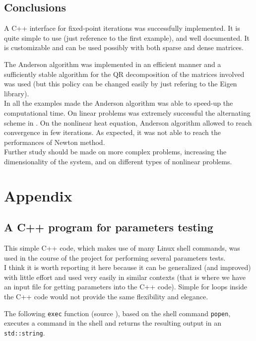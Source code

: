\documentclass[12pt]{article}
\begin{document}
			\subsection{Conclusions}
			A C++ interface for fixed-point iterations was successfully implemented. It is quite simple
			to use (just reference to the first example), and well documented. It is customizable and can be
			used possibly with both sparse and dense matrices.
			
			The Anderson algorithm was implemented in
			an efficient manner and a sufficiently stable algorithm for the QR decomposition of the
			matrices involved was used (but this policy can be changed easily by just refering to the Eigen
			library).\\
			In all the examples made the Anderson algorithm was able to speed-up the computational
			time.	On linear problems was extremely successful the alternating scheme in \cite{Pratapa}.
			On the nonlinear heat equation, Anderson algorithm allowed to reach convergence in few
			iterations. As expected, it was not able to reach the performances of Newton method.\\
			Further study should be made on more complex problems, increasing the dimensionality
			of the system, and on different types of nonlinear problems.

			\appendix
			\section{Appendix}
			\subsection{A C++ program for parameters testing}
			This simple C++ code, which makes use of many Linux shell commands, was used in
			the course of the project for performing several parameters tests.\\ 
			I think it is worth reporting it here because it can be generalized (and improved) with little
			effort and used very easily in similar contexts (that is where we have an input file
			for getting parameters into the C++ code). Simple for loops inside the C++ code would not provide
			the same flexibility and elegance.
			
			The following \verb|exec| function (source \cite{stack}), based on the shell command \verb|popen|, 
			executes a command in the shell and returns the resulting output
			in an \verb|std::string|.
			
\end{document}
